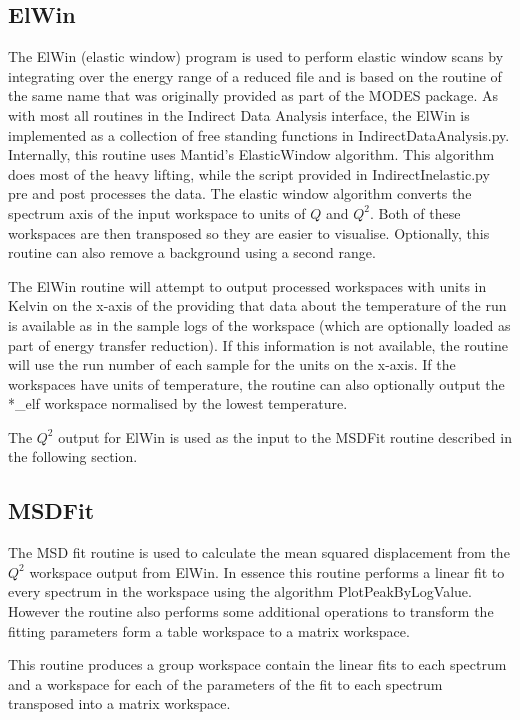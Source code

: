 \documentclass[paper=a4, fontsize=11pt]{scrartcl}	%
\numberwithin{equation}{section}															%
\numberwithin{figure}{section}																%
\numberwithin{table}{section}																%
\begin{document}
\subsection{ElWin}
The ElWin (elastic window) program is used to perform elastic window scans by integrating over the energy range of a reduced file and is based on the routine of the same name that was originally provided as part of the MODES package. As with most all routines in the Indirect Data Analysis interface, the ElWin is implemented as a collection of free standing functions in IndirectDataAnalysis.py. Internally, this routine uses Mantid's ElasticWindow algorithm. This algorithm does most of the heavy lifting, while the script provided in IndirectInelastic.py pre and post processes the data. The elastic window algorithm converts the spectrum axis of the input workspace to units of $Q$ and $Q^2$. Both of these workspaces are then transposed so they are easier to visualise. Optionally, this routine can also remove a background using a second range.

The ElWin routine will attempt to output processed workspaces with units in Kelvin on the x-axis of the  providing that data about the temperature of the run is available as in the sample logs of the workspace (which are optionally loaded as part of energy transfer reduction). If this information is not available, the routine will use the run number of each sample for the units on the x-axis. If the workspaces have units of temperature, the routine can also optionally output the \**\_elf workspace normalised by the lowest temperature.

The $Q^2$ output for ElWin is used as the input to the MSDFit routine described in the following section.

\subsection{MSDFit}
The MSD fit routine is used to calculate the mean squared displacement from the $Q^2$ workspace output from ElWin. In essence this routine performs a linear fit to every spectrum in the workspace using the algorithm PlotPeakByLogValue. However the routine also performs some additional operations to transform the fitting parameters form a table workspace to a matrix workspace.

This routine produces a group workspace contain the linear fits to each spectrum and a workspace for each of the parameters of the fit to each spectrum transposed into a matrix workspace.
\end{document}
